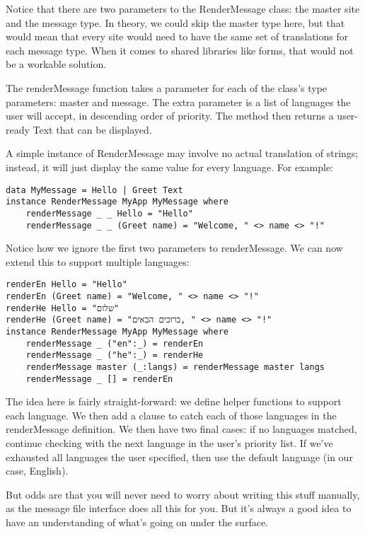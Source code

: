 Notice that there are two parameters to the RenderMessage class: the master site and the message type. In theory, we could skip the master type here, but that would mean that every site would need to have the same set of translations for each message type. When it comes to shared libraries like forms, that would not be a workable solution.

The renderMessage function takes a parameter for each of the class's type parameters: master and message. The extra parameter is a list of languages the user will accept, in descending order of priority. The method then returns a user-ready Text that can be displayed.

A simple instance of RenderMessage may involve no actual translation of strings; instead, it will just display the same value for every language. For example:

\begin{lstlisting}
data MyMessage = Hello | Greet Text
instance RenderMessage MyApp MyMessage where
    renderMessage _ _ Hello = "Hello"
    renderMessage _ _ (Greet name) = "Welcome, " <> name <> "!"
\end{lstlisting}
    
Notice how we ignore the first two parameters to renderMessage. We can now extend this to support multiple languages:

\begin{lstlisting}
renderEn Hello = "Hello"
renderEn (Greet name) = "Welcome, " <> name <> "!"
renderHe Hello = "שלום"
renderHe (Greet name) = "ברוכים הבאים, " <> name <> "!"
instance RenderMessage MyApp MyMessage where
    renderMessage _ ("en":_) = renderEn
    renderMessage _ ("he":_) = renderHe
    renderMessage master (_:langs) = renderMessage master langs
    renderMessage _ [] = renderEn
\end{lstlisting}

The idea here is fairly straight-forward: we define helper functions to support each language. We then add a clause to catch each of those languages in the renderMessage definition. We then have two final cases: if no languages matched, continue checking with the next language in the user's priority list. If we've exhausted all languages the user specified, then use the default language (in our case, English).

But odds are that you will never need to worry about writing this stuff manually, as the message file interface does all this for you. But it's always a good idea to have an understanding of what's going on under the surface.

